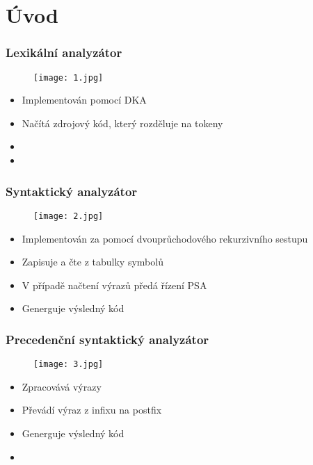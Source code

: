 \documentclass{beamer}
\begin{document}
\section{Úvod} %


\begin{frame}
\frametitle{Lexikální analyzátor}
    \begin{figure}[!p]
			\texttt{[image: 1.jpg]}
			\end{figure}
		\begin{itemize}
        	\item Implementován pomocí DKA
        	\item Načítá zdrojový kód, který rozděluje na tokeny
        	\item[]
        	\item[]
    	\end{itemize} 		    	    
\end{frame}


\begin{frame}
\frametitle{Syntaktický analyzátor}
    \begin{figure}[!p]
			\texttt{[image: 2.jpg]}
			\end{figure}
		\begin{itemize}
        	\item Implementován za pomocí dvouprůchodového 				rekurzivního sestupu
        	\item Zapisuje a čte z tabulky symbolů
        	\item V případě načtení výrazů předá řízení PSA
        	\item Generguje výsledný kód
    	\end{itemize}   		    	    
\end{frame}


\begin{frame}
\frametitle{Precedenční syntaktický analyzátor}
    \begin{figure}[!p]
			\texttt{[image: 3.jpg]}
			\end{figure}
		\begin{itemize}
        	\item Zpracovává výrazy
        	\item Převádí výraz z infixu na postfix
        	\item Generguje výsledný kód
        	\item[]
    	\end{itemize}   		    	    
\end{frame}
\end{document}
